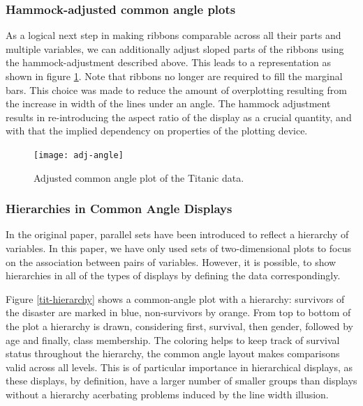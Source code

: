 \subsubsection{Hammock-adjusted common angle plots}
As a logical next step in making ribbons comparable across all their parts and multiple variables, we can additionally adjust sloped parts of the ribbons using the hammock-adjustment described above. This leads to a representation as shown in figure \ref{adj.angle}. Note that ribbons no longer are required to fill the marginal bars. This choice was made to reduce the amount of overplotting resulting from the increase in width of the lines under an angle. The hammock adjustment results in re-introducing the aspect ratio of the display as a crucial quantity, and with that the implied dependency on  properties of the plotting device. 
\begin{figure}[hbtp]
\texttt{[image: adj-angle]}
\caption{\label{adj.angle} Adjusted common angle plot of the Titanic data.}
\end{figure}

\subsubsection{Hierarchies in Common Angle Displays}
In the original paper, parallel sets have been introduced to reflect a hierarchy of variables. In this paper, we have only used  sets of two-dimensional plots to focus on the association between pairs of variables. 
However, it is possible, to show hierarchies in all of the types of displays by defining the data correspondingly. 

Figure \ref{tit-hierarchy}
shows a common-angle plot  with a hierarchy: survivors of the disaster are marked in blue, non-survivors by orange. From top to bottom of the plot a hierarchy is drawn, considering first, survival, then gender, followed by age and finally, class membership. The coloring helps to keep track of survival status throughout the hierarchy, the common angle layout makes comparisons valid across all levels. This is of particular importance in hierarchical displays, as these displays, by definition, have a larger number of smaller groups than displays without a hierarchy acerbating problems induced by the line width illusion.

